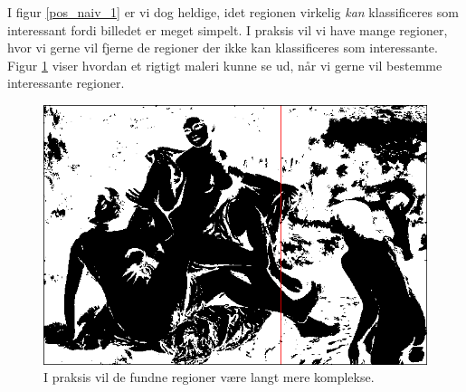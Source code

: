 {I figur \ref{pos_naiv_1} er vi dog heldige, idet regionen virkelig
\emph{kan} klassificeres som interessant fordi billedet er meget simpelt. I
praksis vil vi have mange regioner, hvor vi gerne vil fjerne de regioner
der ikke kan klassificeres som interessante. Figur
\ref{realworld_example} viser hvordan et rigtigt maleri kunne se ud, når
vi gerne vil bestemme interessante regioner.
\begin{figure}[p]
	\begin{center}
		\includegraphics[scale=0.42,angle=0]{afsnit/vores_implementation/billeder/naiv_algoritme/bathers_mockup_blob}
	\end{center}
	\caption[Interessante regioner i praksis]{I praksis vil de
	fundne regioner være langt mere komplekse.}
	\label{realworld_example}
\end{figure}

}
